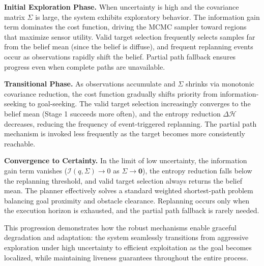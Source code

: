 \textbf{Initial Exploration Phase.} When uncertainty is high and the covariance matrix $\Sigma$ is large, the system exhibits exploratory behavior. The information gain term dominates the cost function, driving the MCMC sampler toward regions that maximize sensor utility. Valid target selection frequently selects samples far from the belief mean (since the belief is diffuse), and frequent replanning events occur as observations rapidly shift the belief. Partial path fallback ensures progress even when complete paths are unavailable.

\textbf{Transitional Phase.} As observations accumulate and $\Sigma$ shrinks via monotonic covariance reduction, the cost function gradually shifts priority from information-seeking to goal-seeking. The valid target selection increasingly converges to the belief mean (Stage 1 succeeds more often), and the entropy reduction $\Delta \mathcal{H}$ decreases, reducing the frequency of event-triggered replanning. The partial path mechanism is invoked less frequently as the target becomes more consistently reachable.

\textbf{Convergence to Certainty.} In the limit of low uncertainty, the information gain term vanishes ($\mathcal{I}(q, \Sigma) \to 0$ as $\Sigma \to \mathbf{0}$), the entropy reduction falls below the replanning threshold, and valid target selection always returns the belief mean. The planner effectively solves a standard weighted shortest-path problem balancing goal proximity and obstacle clearance. Replanning occurs only when the execution horizon is exhausted, and the partial path fallback is rarely needed.

This progression demonstrates how the robust mechanisms enable graceful degradation and adaptation: the system seamlessly transitions from aggressive exploration under high uncertainty to efficient exploitation as the goal becomes localized, while maintaining liveness guarantees throughout the entire process.
